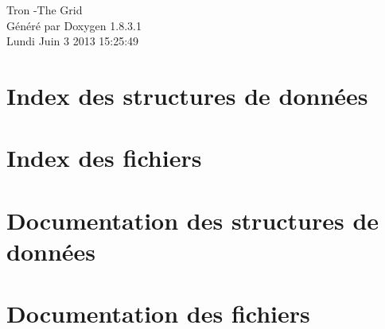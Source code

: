 \documentclass{book}
\begin{document}
\hypersetup{pageanchor=false,citecolor=blue}
\begin{titlepage}
\vspace*{7cm}
\begin{center}
{\Large Tron -\/\-The Grid }\\
\vspace*{1cm}
{\large Généré par Doxygen 1.8.3.1}\\
\vspace*{0.5cm}
{\small Lundi Juin 3 2013 15:25:49}\\
\end{center}
\end{titlepage}
\clearemptydoublepage
{}
\tableofcontents
\clearemptydoublepage
{}
\hypersetup{pageanchor=true,citecolor=blue}
\chapter{Index des structures de données}

\chapter{Index des fichiers}

\chapter{Documentation des structures de données}












\chapter{Documentation des fichiers}




























\printindex
\end{document}
